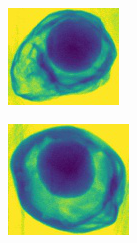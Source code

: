 \documentclass[11pt]{article}
\begin{document}
\begin{figure}[!h]
     \centering
     \begin{subfigure}[b]{0.18\textwidth}
         \centering
         \includegraphics[width=\textwidth]{figurer/data/avo0-part0.jpg}
         \caption{}
         \label{fig:data_avo_clip_1}
     \end{subfigure}
     \hfill
     \begin{subfigure}[b]{0.18\textwidth}
         \centering
         \includegraphics[width=\textwidth]{figurer/data/avo0-part1.jpg}

\end{subfigure}
\end{figure}
\end{document}
